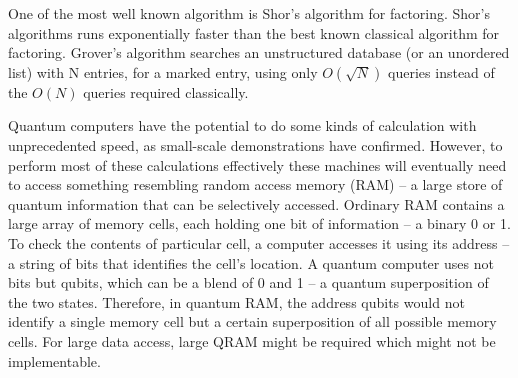 One of the most well known algorithm is Shor's algorithm for factoring. Shor's algorithms runs exponentially faster than the best known classical algorithm for factoring. Grover's algorithm searches an unstructured database (or an unordered list) with N entries, for a marked entry, using only $O({\sqrt {N}})$ queries instead of the $O(N)$ queries required classically. \par\bigskip
Quantum computers have the potential to do some kinds of calculation with unprecedented speed, as small-scale demonstrations have confirmed. However, to perform most of these calculations effectively these machines will eventually need to access something resembling random access memory (RAM) -- a large store of quantum information that can be selectively accessed. Ordinary RAM contains a large array of memory cells, each holding one bit of information -- a binary 0 or 1. To check the contents of particular cell, a computer accesses it using its address -- a string of bits that identifies the cell's location. A quantum computer uses not bits but qubits, which can be a blend of 0 and 1 -- a quantum superposition of the two states. Therefore, in quantum RAM, the address qubits would not identify a single memory cell but a certain superposition of all possible memory cells.  For large data access, large QRAM might be required which might not be implementable.

